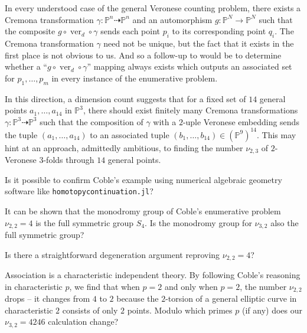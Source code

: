 \documentclass{article}
\renewcommand{\P}{\mathbb{P}}
\DeclareMathOperator{\ver}{ver}
\begin{document}
In every understood case of the general Veronese counting problem, there exists a Cremona transformation $\gamma: \P^{n} \dashrightarrow \P^{n}$ and an automorphism $g: \P^{N} \to \P^{N}$ such that the composite $g \circ \ver_{d} \circ \gamma$ sends each point $p_{i}$ to its corresponding point $q_{i}$. The Cremona transformation $\gamma$ need not be unique, but the fact that it exists in the first place is not obvious to us.  And so a follow-up to  would be to determine whether a ``$g \circ \ver_{d} \circ \gamma$'' mapping always exists which outputs an associated set for $p_1, \dots, p_m$ in every instance of the enumerative problem.

\begin{remark}
    In this direction, a dimension count suggests that for a fixed set of $14$ general points $a_1, \dots, a_{14}$ in $\P^{3}$, there should exist finitely many  Cremona transformations $\gamma: \P^{3} \dashrightarrow \P^{3}$ such that the composition of $\gamma$ with a $2$-uple Veronese embedding sends the tuple $(a_{1}, \dots, a_{14})$ to an associated tuple $(b_{1}, \dots, b_{14}) \in (\P^{9})^{14}$.  This may hint at an approach, admittedly ambitious, to finding the number $\nu_{2,3}$ of $2$-Veronese $3$-folds through $14$ general points.
\end{remark}   

\begin{question}
    \label{question:numerical}
    Is it possible to confirm Coble's example using numerical algebraic geometry software like \texttt{homotopycontinuation.jl}?
\end{question}

\begin{question}
    \label{question:monodromy} It can be shown that the monodromy group of Coble's enumerative problem $\nu_{2,2}=4$ is the full symmetric group $S_{4}$.  Is the monodromy group for $\nu_{3,2}$ also the full symmetric group?
\end{question}

\begin{question}
    \label{question:degeneration} Is there a straightforward degeneration argument reproving $\nu_{2,2}=4$?
\end{question}

\begin{question}
    \label{question:charp} Association is a characteristic independent theory.  By following Coble's reasoning in characteristic $p$, we find that when $p=2$ and only when $p=2$, the number $\nu_{2,2}$ drops -- it changes from $4$ to $2$ because the $2$-torsion of a general elliptic curve in characteristic $2$ consists of only $2$ points.  Modulo which primes $p$ (if any) does our $\nu_{3,2}= 4246$ calculation change?
\end{question}
\end{document}
